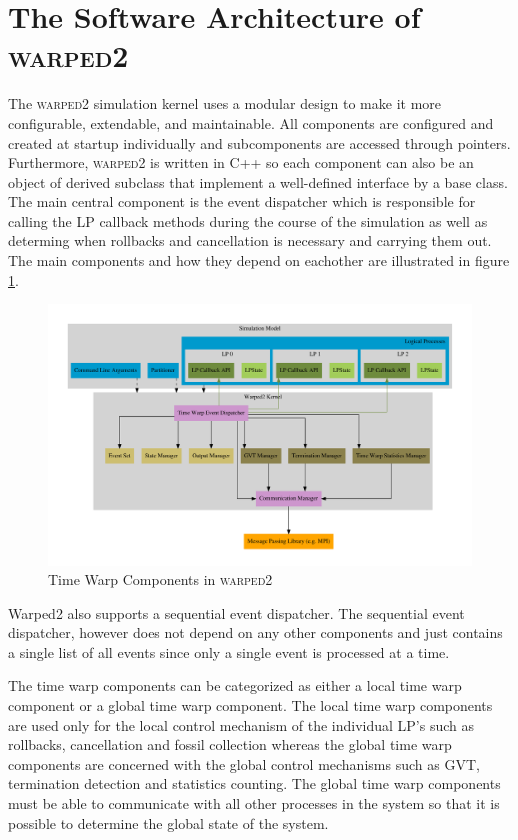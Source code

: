 \documentclass[11pt]{book}
\begin{document}
\section{The Software Architecture of \textsc{warped2}}

The \textsc{warped2} simulation kernel uses a modular design to make it more configurable,
extendable, and maintainable. All components are configured and created at startup individually
and subcomponents are accessed through pointers. Furthermore, \textsc{warped2} is written in
C++ so each component can also be an object of derived subclass that implement a well-defined
interface by a base class. The main central component is the event dispatcher which is responsible
for calling the LP callback methods during the course of the simulation as well as determing
when rollbacks and cancellation is necessary and carrying them out. The main components and
how they depend on eachother are illustrated in figure \ref{warped2_architecture}.

\begin{figure}[H]
    \centering
    \includegraphics[width=\textwidth]{figs/graphviz/warped2_overview.pdf}
    \caption{Time Warp Components in \textsc{warped2}}\label{warped2_architecture}
\end{figure}

Warped2 also supports a sequential event dispatcher. The sequential event dispatcher, however
does not depend on any other components and just contains a single list of all events since
only a single event is processed at a time.

The time warp components can be categorized as either a local time warp component or a global
time warp component. The local time warp components are used only for the local control
mechanism of the individual LP's such as rollbacks, cancellation and fossil collection whereas
the global time warp components are concerned with the global control mechanisms such as GVT,
termination detection and statistics counting. The global time warp components must be able to
communicate with all other processes in the system so that it is possible to determine the
global state of the system.
\end{document}
